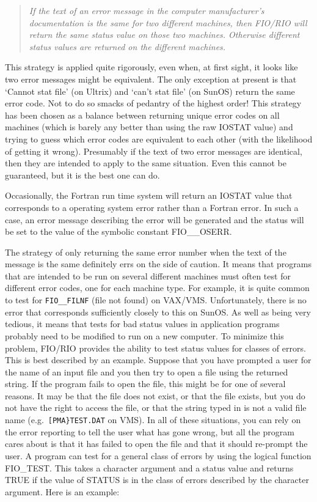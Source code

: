 \documentclass[twoside,11pt,nolof]{starlink}
\begin{document}
\begin{quote}\emph{If the text of an error message in the computer manufacturer's documentation is
the same for two different machines, then FIO/RIO will return the same status
value on those two machines. Otherwise different status values are returned on
the different machines.
}
\end{quote}

This strategy is applied quite rigorously, even when, at first sight, it looks
like two error messages might be equivalent. The only exception at present is
that `Cannot stat file' (on Ultrix) and `can't stat file' (on SunOS) return the
same error code. Not to do so smacks of pedantry of the highest order! This
strategy has been chosen as a balance between returning unique error codes on
all machines (which is barely any better than using the raw IOSTAT value) and
trying to guess which error codes are equivalent to each other (with the
likelihood of getting it wrong). Presumably if the text of two error messages
are identical, then they are intended to apply to the same situation. Even this
cannot be guaranteed, but it is the best one can do.

Occasionally, the Fortran run time system will return an IOSTAT value that
corresponds to a operating system error rather than a Fortran error. In such a
case, an error message describing the error will be generated and the status
will be set to the value of the symbolic constant FIO\_\_OSERR.

The strategy of only returning the same error number when the text of the
message is the same definitely errs on the side of caution. It means that
programs that are intended to be run on several different machines must often
test for different error codes, one for each machine type. For example, it is
quite common to test for \texttt{FIO\_\_FILNF} (file not found) on VAX/VMS.
Unfortunately, there is no error that corresponds sufficiently closely to this
on SunOS. As well as being very tedious, it means that tests for bad status
values in application programs probably need to be modified to run on a new
computer. To minimize this problem, FIO/RIO provides the ability to test status
values for classes of errors. This is best described by an example. Suppose
that you have prompted a user for the name of an input file and you then try to
open a file using the returned string. If the program fails to open the file,
this might be for one of several reasons. It may be that the file
does not exist, or that the file exists, but you do not have the right to
access the file, or that the string typed in is not a valid file name
(e.g.\ \texttt{[PMA\}TEST.DAT} on VMS).
In all of these situations, you can rely on the error reporting to tell the
user what has gone wrong, but all the program cares about is that it has
failed to open the file and that it should re-prompt the user.
A program can test for a general class of errors by using the logical function
FIO\_TEST. This takes a character argument and a status value and returns TRUE
if the value of STATUS is in the class of errors described by the character
argument.
Here is an example:
\end{document}
